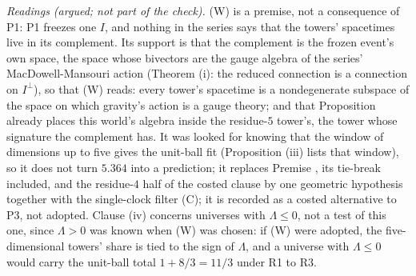 \emph{Readings (argued; not part of the check).} (W) is a premise, not a consequence of P1: P1 freezes one $I$, and nothing in the series says that the towers' spacetimes live in its complement. Its support is that the complement is the frozen event's own space, the space whose bivectors are the gauge algebra of the series' MacDowell-Mansouri action (Theorem (i): the reduced connection is a connection on $I^{\perp}$), so that (W) reads: every tower's spacetime is a nondegenerate subspace of the space on which gravity's action is a gauge theory; and that Proposition  already places this world's algebra inside the residue-$5$ tower's, the tower whose signature the complement has. It was looked for knowing that the window of dimensions up to five gives the unit-ball fit (Proposition (iii) lists that window), so it does not turn $5.364$ into a prediction; it replaces Premise , its tie-break included, and the residue-$4$ half of the costed clause by one geometric hypothesis together with the single-clock filter (C); it is recorded as a costed alternative to P3, not adopted. Clause (iv) concerns universes with $\Lambda \le 0$, not a test of this one, since $\Lambda > 0$ was known when (W) was chosen: if (W) were adopted, the five-dimensional towers' share is tied to the sign of $\Lambda$, and a universe with $\Lambda \le 0$ would carry the unit-ball total $1 + 8/3 = 11/3$ under R1 to R3.
